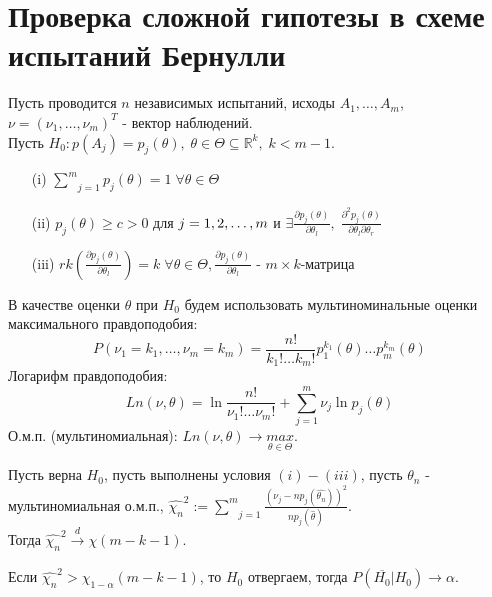 \section{Проверка сложной гипотезы в схеме испытаний Бернулли}\label{lec:8/sec:1}

Пусть проводится $n$ независимых испытаний, исходы $A_1, \dots, A_m$, $\nu = (\nu_1, \dots, \nu_m)^T$ - вектор наблюдений.\\
Пусть $H_0: p(A_j) = p_j (\theta), \; \theta \in \Theta \subseteq \mathbb{R}^k, \; k < m-1$.\\

\vspace{2cm}
\textbf{}
\begin{itemize}
	\item[(i)] $\underset{j=1}{\overset{m}{\sum}}p_j (\theta) = 1 \; \forall \theta \in \Theta$
	\item[(ii)] $p_j (\theta) \ge c > 0$ для $j =1,2,\dots,m$ и $\exists \frac{\partial p_j (\theta)}{\partial \theta_l}, \; \frac{\partial^2 p_j (\theta)}{\partial \theta_l \partial \theta_r}$
	\item[(iii)] $rk \left( \frac{\partial p_j (\theta)}{\partial \theta_l} \right) = k \; \forall \theta \in \Theta, \frac{\partial p_j (\theta)}{\partial \theta_l}$ - $m\times k$-матрица
\end{itemize}

В качестве оценки $\theta$ при $H_0$ будем использовать мультиноминальные оценки максимального правдоподобия:
$$P(\nu_1 = k_1, \dots, \nu_m = k_m) = \frac{n!}{k_1! \dots k_m!} p_1^{k_1} (\theta) \dots p_m^{k_m} (\theta)$$
Логарифм правдоподобия:
$$Ln (\nu, \theta) = \ln \frac{n!}{\nu_1! \dots \nu_m!} + \underset{j=1}{\overset{m}{\sum}}\nu_j \ln p_j (\theta)$$
О.м.п. (мультиномиальная): $Ln (\nu, \theta) \to \underset{\theta \in \Theta}{max}$.

\begin{theorem}\label{lec:8/the:1}
	Пусть верна $H_0$, пусть выполнены условия $(i)-(iii)$, пусть $\theta_n$ - мультиномиальная о.м.п., $\hat{\chi_n}^2 := \underset{j=1}{\overset{m}{\sum}}\frac{(\nu_j - n p_j (\hat{\theta_n}))^2}{n p_j (\hat{\theta})}$. \\
	Тогда $\hat{\chi_n}^2 \xrightarrow[]{d} \chi(m-k-1)$.
\end{theorem}

\begin{rulee}\label{lec:8/rule:1}
	Если $\hat{\chi_n}^2 > \chi_{1-\alpha}(m-k-1)$, то $H_0$ отвергаем, тогда $P(\overline{H_0}|H_0)\to \alpha$.
\end{rulee}

